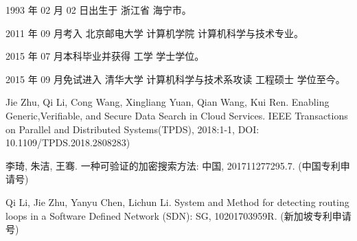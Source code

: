 \begin{resume}


  1993 年 02 月 02 日出生于 浙江省 海宁市。

  2011 年 09 月考入 北京邮电大学 计算机学院 计算机科学与技术专业。

  2015 年 07 月本科毕业并获得 工学 学士学位。

  2015 年 09 月免试进入 清华大学 计算机科学与技术系攻读 工程硕士 学位至今。



  \begin{publications}[before=\publicationskip,after=\publicationskip]
    \item Jie Zhu, Qi Li, Cong Wang, Xingliang Yuan, Qian Wang, Kui Ren. Enabling Generic,Verifiable, and Secure Data Search in Cloud Services. IEEE Transactions on Parallel and Distributed Systems(TPDS), 2018:1-1, DOI: 10.1109/TPDS.2018.2808283)
  \end{publications}


  \begin{achievements}
    \item 李琦, 朱洁, 王骞. 一种可验证的加密搜索方法: 中国, 201711277295.7. (中国专利申请号)
    \item Qi Li, Jie Zhu, Yanyu Chen, Lichun Li. System and Method for detecting routing loops in a Software Defined Network (SDN): SG, 10201703959R. (新加坡专利申请号)
  \end{achievements}

\end{resume}
